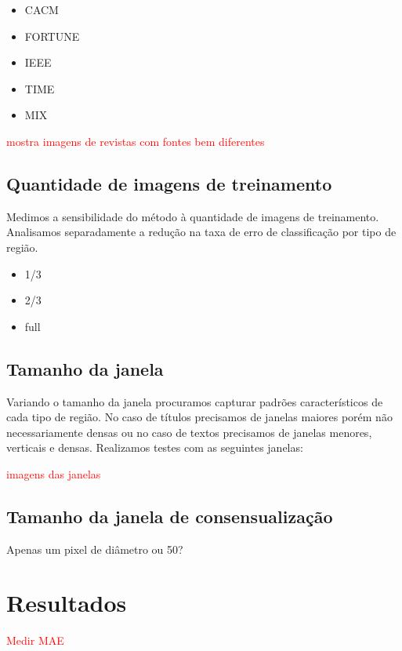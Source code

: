 \documentclass[a4paper,11pt]{article}
\newcommand{\TODO}[1]{\textcolor{red}{#1}}
\begin{document}
    \begin{itemize}
      \item CACM
      \item FORTUNE
      \item IEEE
      \item TIME
      \item MIX
    \end{itemize}

    \TODO{mostra imagens de revistas com fontes bem diferentes}

  \subsection{Quantidade de imagens de treinamento}

    Medimos a sensibilidade do método à quantidade de imagens de treinamento. Analisamos separadamente a redução na taxa de erro de classificação por tipo de região.

    \begin{itemize}
      \item 1/3
      \item 2/3
      \item full
    \end{itemize}

  \subsection{Tamanho da janela}

    Variando o tamanho da janela procuramos capturar padrões característicos de cada tipo de região. No caso de títulos precisamos de janelas maiores porém não necessariamente densas ou no caso de textos precisamos de janelas menores, verticais e densas. Realizamos testes com as seguintes janelas:

    \TODO{imagens das janelas}

  \subsection{Tamanho da janela de consensualização}

    Apenas um pixel de diâmetro ou 50?

\section{Resultados}

  \TODO{Medir MAE}
\end{document}
